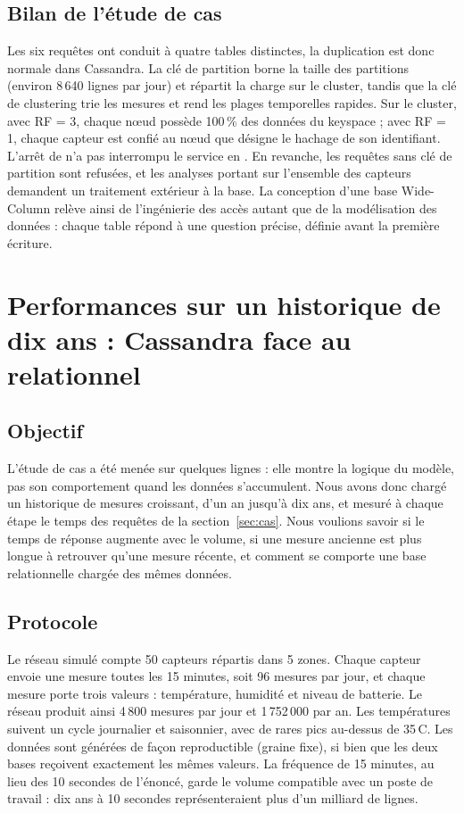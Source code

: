 \documentclass[11pt,a4paper]{article}
\newcommand{\cq}[1]{\texttt{\detokenize{#1}}}
\begin{document}
\subsection{Bilan de l'étude de cas}
Les six requêtes ont conduit à quatre tables distinctes, la duplication est donc normale dans Cassandra. La clé de partition \cq{(sensor_id, day)} borne la taille des partitions (environ 8\,640 lignes par jour) et répartit la charge sur le cluster, tandis que la clé de clustering \cq{ts} trie les mesures et rend les plages temporelles rapides. Sur le cluster, avec RF = 3, chaque nœud possède 100\,\% des données du keyspace \cq{iot} ; avec RF = 1, chaque capteur est confié au nœud que désigne le hachage de son identifiant. L'arrêt de \cq{cass3} n'a pas interrompu le service en \cq{QUORUM}. En revanche, les requêtes sans clé de partition sont refusées, et les analyses portant sur l'ensemble des capteurs demandent un traitement extérieur à la base.
La conception d'une base Wide-Column relève ainsi de l'ingénierie des accès autant que de la modélisation des données : chaque table répond à une question précise, définie avant la première écriture.

\section{Performances sur un historique de dix ans : Cassandra face au relationnel}
\label{sec:perf}

\subsection{Objectif}
L'étude de cas a été menée sur quelques lignes : elle montre la logique du modèle, pas son comportement quand les données s'accumulent. Nous avons donc chargé un historique de mesures croissant, d'un an jusqu'à dix ans, et mesuré à chaque étape le temps des requêtes de la section~\ref{sec:cas}. Nous voulions savoir si le temps de réponse augmente avec le volume, si une mesure ancienne est plus longue à retrouver qu'une mesure récente, et comment se comporte une base relationnelle chargée des mêmes données.

\subsection{Protocole}
Le réseau simulé compte 50 capteurs répartis dans 5 zones. Chaque capteur envoie une mesure toutes les 15 minutes, soit 96 mesures par jour, et chaque mesure porte trois valeurs : température, humidité et niveau de batterie. Le réseau produit ainsi 4\,800 mesures par jour et 1\,752\,000 par an. Les températures suivent un cycle journalier et saisonnier, avec de rares pics au-dessus de 35\,\textdegree C. Les données sont générées de façon reproductible (graine fixe), si bien que les deux bases reçoivent exactement les mêmes valeurs. La fréquence de 15 minutes, au lieu des 10 secondes de l'énoncé, garde le volume compatible avec un poste de travail : dix ans à 10 secondes représenteraient plus d'un milliard de lignes.
\end{document}

